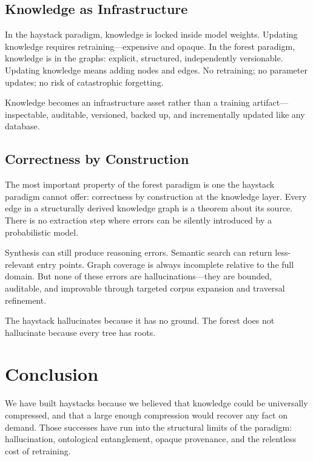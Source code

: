 \documentclass{article}
\begin{document}
\subsection{Knowledge as Infrastructure}

In the haystack paradigm, knowledge is locked inside model weights.  Updating
knowledge requires retraining---expensive and opaque.  In the forest paradigm,
knowledge is in the graphs: explicit, structured, independently versionable.
Updating knowledge means adding nodes and edges.  No retraining; no parameter
updates; no risk of catastrophic forgetting.

Knowledge becomes an infrastructure asset rather than a training artifact---
inspectable, auditable, versioned, backed up, and incrementally updated like any
database.

\subsection{Correctness by Construction}

The most important property of the forest paradigm is one the haystack paradigm
cannot offer: correctness by construction at the knowledge layer.  Every edge in
a structurally derived knowledge graph is a theorem about its source.  There is
no extraction step where errors can be silently introduced by a probabilistic
model.

Synthesis can still produce reasoning errors.  Semantic search can return
less-relevant entry points.  Graph coverage is always incomplete relative to the
full domain.  But none of these errors are hallucinations---they are bounded,
auditable, and improvable through targeted corpus expansion and traversal
refinement.

The haystack hallucinates because it has no ground.  The forest does not
hallucinate because every tree has roots.

\section{Conclusion}

We have built haystacks because we believed that knowledge could be universally
compressed, and that a large enough compression would recover any fact on demand.
Those successes have run into the structural limits of the paradigm:
hallucination, ontological entanglement, opaque provenance, and the relentless
cost of retraining.
\end{document}

